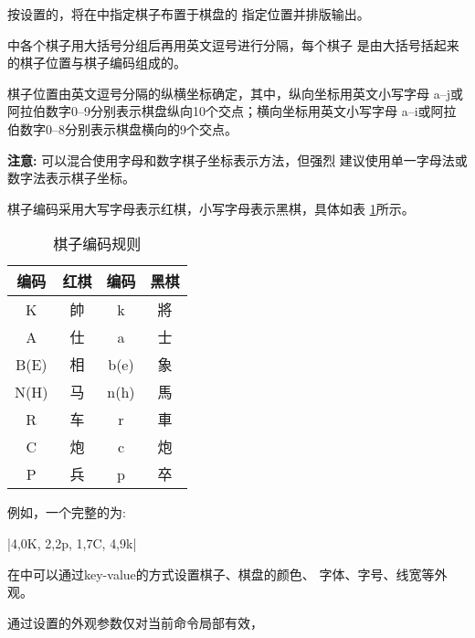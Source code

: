 \documentclass[full]{l3doc}
\begin{document}
\begin{documentation}
\begin{function}{\cchessman}
  \begin{syntax}
      
  \end{syntax}
\end{function}

  按设置的，将在中指定棋子布置于棋盘的
  指定位置并排版输出。

  中各个棋子用大括号分组后再用英文逗号进行分隔，每个棋子
  是由大括号括起来的\textsf{棋子位置}与\textsf{棋子编码}组成的。

  棋子位置由英文逗号分隔的纵横坐标确定，其中，纵向坐标用英文小写字母
  a--j或阿拉伯数字0--9分别表示棋盘纵向10个交点；横向坐标用英文小写字母
  a--i或阿拉伯数字0--8分别表示棋盘横向的9个交点。

  \textbf{\textsf{注意: }}可以混合使用字母和数字棋子坐标表示方法，但强烈
  建议使用单一字母法或数字法表示棋子坐标。

  棋子编码采用大写字母表示红棋，小写字母表示黑棋，具体如表%
  \ref{tab-piececode}所示。

  \begin{table}[!htbp]
    \centering
    \caption{棋子编码规则}\label{tab-piececode}
    \begin{tabular}{cc||cc}
      \hline
      编码 & 红棋 & 编码 & 黑棋\\\hline
      K    & 帥   & k    & 將  \\
      A    & 仕   & a    & 士  \\
      B(E) & 相   & b(e) & 象  \\
      N(H) & 马   & n(h) & 馬  \\
      R    & 车   & r    & 車  \\
      C    & 炮   & c    & 炮  \\
      P    & 兵   & p    & 卒  \\\hline
    \end{tabular}
  \end{table}

  例如，一个完整的为:

  |{{4,0}{K}}, {{2,2}{p}}, {{1,7}{C}}, {{4,9}{k}}|

  在中可以通过key-value的方式设置棋子、棋盘的颜色、
  字体、字号、线宽等外观。

  通过设置的外观参数仅对当前命令局部有效，

\begin{SideBySideExample}[frame=single,numbers=left,
                xrightmargin=.50\linewidth,gobble=2]
  \centering
\end{SideBySideExample}


\end{documentation}
\end{document}
